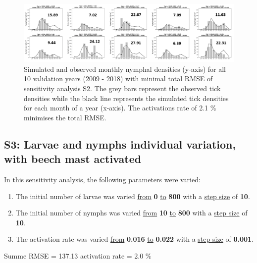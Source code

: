 \documentclass[a4paper, 11pt]{scrartcl}
\begin{document}
\begin{figure}[h!]
\centering
\includegraphics[width=1.0\textwidth]{figures/initial_ticks_without_beech}
\caption{Simulated and observed monthly nymphal densities (y-axis) for all 10 validation years (2009 - 2018) with minimal total RMSE of sensitivity analysis S2. The grey bars
represent the observed tick densities while the black line represents the simulated tick densities for each month of a year (x-axis). The activations rate of 2.1 \% minimises
the total RMSE.}
\label{fig:initial_ticks_without_beech}
\end{figure}


\newpage
\subsection{S3: Larvae and nymphs individual variation, with beech mast activated}
In this sensitivity analysis, the following parameters were varied:

\begin{enumerate}
\item The initial number of larvae was varied \underline{from} \textbf{0} \underline{to} \textbf{800} with a \underline{step size} of \textbf{10}.
\item The initial number of nymphs was varied \underline{from} \textbf{10} \underline{to} \textbf{800} with a \underline{step size} of \textbf{10}.
\item The activation rate was varied \underline{from} \textbf{0.016} \underline{to} \textbf{0.022} with a \underline{step size} of \textbf{0.001}.
\end{enumerate}

Summe RMSE = 137.13
activation rate = 2.0 \%
\end{document}

